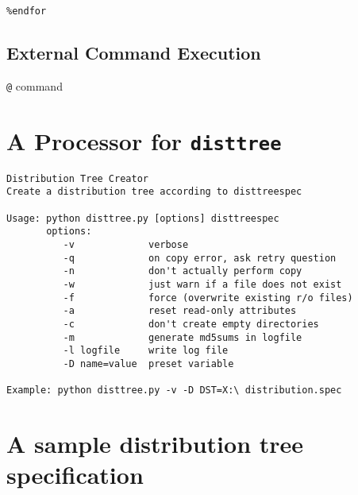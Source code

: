 \documentclass{article}
\newcommand{\disttree}{{\tt disttree}}
\begin{document}
{\tt \%endfor}



\subsection{External Command Execution}

{\tt @} command

\section{A Processor for \disttree}

\begin{verbatim}
Distribution Tree Creator
Create a distribution tree according to disttreespec

Usage: python disttree.py [options] disttreespec
       options:
          -v             verbose
          -q             on copy error, ask retry question
          -n             don't actually perform copy
          -w             just warn if a file does not exist
          -f             force (overwrite existing r/o files)
          -a             reset read-only attributes
          -c             don't create empty directories
          -m             generate md5sums in logfile
          -l logfile     write log file
          -D name=value  preset variable

Example: python disttree.py -v -D DST=X:\ distribution.spec
\end{verbatim}

\section{A sample distribution tree specification}
\end{document}
